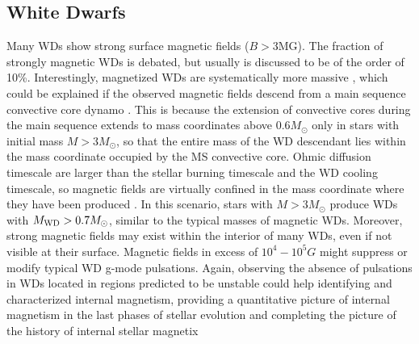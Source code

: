 {\color{red} \subsection{White Dwarfs}}
Many WDs show strong surface magnetic fields ($B>$3MG). The fraction of strongly magnetic WDs is debated, but usually is discussed to be of the order of 10\%. Interestingly, magnetized WDs are systematically more massive \cite{Ferrario_2015}, which could be explained if the observed magnetic fields descend from a main sequence convective core dynamo \cite{Cantiello_2016}. This is because the extension of convective cores during the main sequence extends to mass coordinates above 0.6$M_\odot$ only in stars with initial mass $M>3M_\odot$, so that the entire mass of the WD descendant lies within the mass coordinate occupied by the MS convective core. Ohmic diffusion timescale are larger than the stellar burning timescale and the WD cooling timescale, so magnetic fields are virtually confined in the mass coordinate where they have been produced \cite{Cantiello_2016}. In this scenario, stars with $M>3M_\odot$ produce WDs with $M_{\rm WD}>0.7M_\odot$, similar to the typical masses of magnetic WDs. Moreover, strong magnetic fields may exist within the interior of many WDs, even if not visible at their surface. Magnetic fields in excess of $10^4-10^5 G$ might suppress or modify typical WD g-mode pulsations. Again, observing the absence of pulsations in WDs located in regions predicted to be unstable could help identifying and characterized internal magnetism, providing a quantitative picture of internal magnetism in the last phases of stellar evolution and completing the picture of the history of internal stellar magnetix

